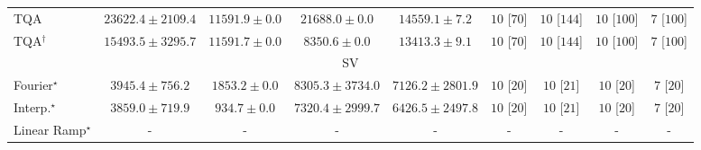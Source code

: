 \begin{tabular}{l|cccc|cccc|}
TQA & {\cellcolor[HTML]{D3EDA0}} \color[HTML]{000000} $23622.4\pm 2109.4$ & {\cellcolor[HTML]{FBFED0}} \color[HTML]{000000} $11591.9\pm 0.0$ & {\cellcolor[HTML]{DDF1A6}} \color[HTML]{000000} $21688.0\pm 0.0$ & {\cellcolor[HTML]{F8FCBE}} \color[HTML]{000000} $14559.1\pm 7.2$ & {\cellcolor[HTML]{49006A}} \color[HTML]{F1F1F1} $10$ [$70$] & {\cellcolor[HTML]{49006A}} \color[HTML]{F1F1F1} $10$ [$144$] & {\cellcolor[HTML]{49006A}} \color[HTML]{F1F1F1} $10$ [$100$] & {\cellcolor[HTML]{CD238F}} \color[HTML]{F1F1F1} $7$ [$100$] \\
TQA$^\dagger$ & {\cellcolor[HTML]{F7FCB9}} \color[HTML]{000000} $15493.5\pm 3295.7$ & {\cellcolor[HTML]{FBFED0}} \color[HTML]{000000} $11591.7\pm 0.0$ & {\cellcolor[HTML]{FFFFE4}} \color[HTML]{000000} $8350.6\pm 0.0$ & {\cellcolor[HTML]{F9FDC5}} \color[HTML]{000000} $13413.3\pm 9.1$ & {\cellcolor[HTML]{49006A}} \color[HTML]{F1F1F1} $10$ [$70$] & {\cellcolor[HTML]{49006A}} \color[HTML]{F1F1F1} $10$ [$144$] & {\cellcolor[HTML]{49006A}} \color[HTML]{F1F1F1} $10$ [$100$] & {\cellcolor[HTML]{CD238F}} \color[HTML]{F1F1F1} $7$ [$100$] \\
\cline{1-9}
\multicolumn{9}{c}{\rule{0pt}{8pt}SV} \\
\midrule
Fourier$^\star$ & {\cellcolor[HTML]{9CB9D9}} \color[HTML]{000000} $3945.4\pm 756.2$ & {\cellcolor[HTML]{EDE7F2}} \color[HTML]{000000} $1853.2\pm 0.0$ & {\cellcolor[HTML]{023C5F}} \color[HTML]{F1F1F1} $8305.3\pm 3734.0$ & {\cellcolor[HTML]{04629A}} \color[HTML]{F1F1F1} $7126.2\pm 2801.9$ & {\cellcolor[HTML]{49006A}} \color[HTML]{F1F1F1} $10$ [$20$] & {\cellcolor[HTML]{49006A}} \color[HTML]{F1F1F1} $10$ [$21$] & {\cellcolor[HTML]{49006A}} \color[HTML]{F1F1F1} $10$ [$20$] & {\cellcolor[HTML]{CD238F}} \color[HTML]{F1F1F1} $7$ [$20$] \\
Interp.$^\star$ & {\cellcolor[HTML]{A1BBDA}} \color[HTML]{000000} $3859.0\pm 719.9$ & {\cellcolor[HTML]{FFF7FB}} \color[HTML]{000000} $934.7\pm 0.0$ & {\cellcolor[HTML]{045E93}} \color[HTML]{F1F1F1} $7320.4\pm 2999.7$ & {\cellcolor[HTML]{0C74B2}} \color[HTML]{F1F1F1} $6426.5\pm 2497.8$ & {\cellcolor[HTML]{49006A}} \color[HTML]{F1F1F1} $10$ [$20$] & {\cellcolor[HTML]{49006A}} \color[HTML]{F1F1F1} $10$ [$21$] & {\cellcolor[HTML]{49006A}} \color[HTML]{F1F1F1} $10$ [$20$] & {\cellcolor[HTML]{CD238F}} \color[HTML]{F1F1F1} $7$ [$20$] \\
Linear Ramp$^\star$ & {\cellcolor[HTML]{000000}} \color[HTML]{F1F1F1} {\cellcolor{white}} \color{black} - & {\cellcolor[HTML]{000000}} \color[HTML]{F1F1F1} {\cellcolor{white}} \color{black} - & {\cellcolor[HTML]{000000}} \color[HTML]{F1F1F1} {\cellcolor{white}} \color{black} - & {\cellcolor[HTML]{000000}} \color[HTML]{F1F1F1} {\cellcolor{white}} \color{black} - & {\cellcolor[HTML]{000000}} \color[HTML]{F1F1F1} {\cellcolor{white}} \color{black} - & {\cellcolor[HTML]{000000}} \color[HTML]{F1F1F1} {\cellcolor{white}} \color{black} - & {\cellcolor[HTML]{000000}} \color[HTML]{F1F1F1} {\cellcolor{white}} \color{black} - & {\cellcolor[HTML]{000000}} \color[HTML]{F1F1F1} {\cellcolor{white}} \color{black} - \\

\end{tabular}

